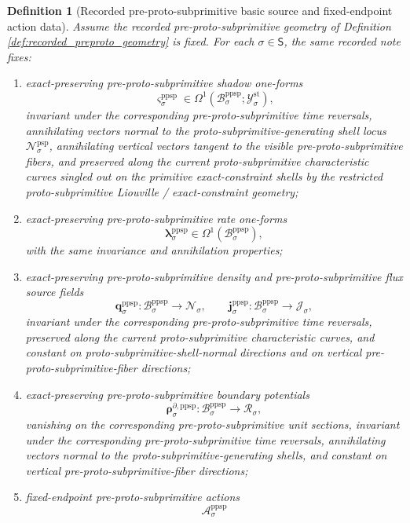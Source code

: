 \documentclass[11pt]{article}
\newcommand{\SectorSet}{\mathsf S}
\newcommand{\StatTagClass}[1]{\mathcal Y_{#1}^{\mathrm{st}}}
\newcommand{\DensityClass}[1]{\mathscr N_{#1}}
\newcommand{\FluxClass}[1]{\mathscr J_{#1}}
\newcommand{\PhaseReadClass}[1]{\mathscr R_{#1}}
\newcommand{\ProtoSubprimSpace}[1]{\mathcal N_{#1}^{\mathrm{psp}}}
\newcommand{\PreProtoSubprimSpace}[1]{\mathcal B_{#1}^{\mathrm{ppsp}}}
\newcommand{\PreProtoSubprimShadowForm}[1]{\boldsymbol{\varsigma}_{#1}^{\mathrm{ppsp}}}
\newcommand{\PreProtoSubprimRateForm}[1]{\boldsymbol{\lambda}_{#1}^{\mathrm{ppsp}}}
\newcommand{\PreProtoSubprimDensitySource}[1]{\boldsymbol{q}_{#1}^{\mathrm{ppsp}}}
\newcommand{\PreProtoSubprimFluxSource}[1]{\boldsymbol{j}_{#1}^{\mathrm{ppsp}}}
\newcommand{\PreProtoSubprimBoundarySource}[1]{\boldsymbol{\rho}_{#1}^{\partial,\mathrm{ppsp}}}
\newcommand{\PreProtoSubprimAction}[1]{\mathscr A_{#1}^{\mathrm{ppsp}}}
\newtheorem{definition}{Definition}
\begin{document}
\begin{definition}[Recorded pre-proto-subprimitive basic source and fixed-endpoint action data]
\label{def:recorded_preproto_basic}
Assume the recorded pre-proto-subprimitive geometry of Definition \ref{def:recorded_preproto_geometry} is fixed. For each \(\sigma\in\SectorSet\), the same recorded note fixes:
\begin{enumerate}
    \item exact-preserving pre-proto-subprimitive shadow one-forms
    \[
    \PreProtoSubprimShadowForm{\sigma}\in\Omega^1(\PreProtoSubprimSpace{\sigma};\StatTagClass{\sigma}),
    \]
    invariant under the corresponding pre-proto-subprimitive time reversals, annihilating vectors normal to the proto-subprimitive-generating shell locus \(\ProtoSubprimSpace{\sigma}\), annihilating vertical vectors tangent to the visible pre-proto-subprimitive fibers, and preserved along the current proto-subprimitive characteristic curves singled out on the primitive exact-constraint shells by the restricted proto-subprimitive Liouville / exact-constraint geometry;
    \item exact-preserving pre-proto-subprimitive rate one-forms
    \[
    \PreProtoSubprimRateForm{\sigma}\in\Omega^1(\PreProtoSubprimSpace{\sigma}),
    \]
    with the same invariance and annihilation properties;
    \item exact-preserving pre-proto-subprimitive density and pre-proto-subprimitive flux source fields
    \[
    \PreProtoSubprimDensitySource{\sigma}:\PreProtoSubprimSpace{\sigma}\to\DensityClass{\sigma},
    \qquad
    \PreProtoSubprimFluxSource{\sigma}:\PreProtoSubprimSpace{\sigma}\to\FluxClass{\sigma},
    \]
    invariant under the corresponding pre-proto-subprimitive time reversals, preserved along the current proto-subprimitive characteristic curves, and constant on proto-subprimitive-shell-normal directions and on vertical pre-proto-subprimitive-fiber directions;
    \item exact-preserving pre-proto-subprimitive boundary potentials
    \[
    \PreProtoSubprimBoundarySource{\sigma}:\PreProtoSubprimSpace{\sigma}\to\PhaseReadClass{\sigma},
    \]
    vanishing on the corresponding pre-proto-subprimitive unit sections, invariant under the corresponding pre-proto-subprimitive time reversals, annihilating vectors normal to the proto-subprimitive-generating shells, and constant on vertical pre-proto-subprimitive-fiber directions;
    \item fixed-endpoint pre-proto-subprimitive actions
    \[
    \PreProtoSubprimAction{\sigma}
\]
\end{enumerate}
\end{definition}
\end{document}
